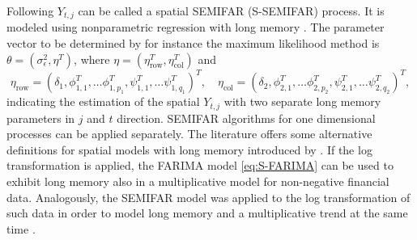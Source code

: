 \documentclass[12pt]{article}
\begin{document}
Following \textcite{beran2009least} \(Y_{t,j}\) can be called a spatial SEMIFAR (S-SEMIFAR) process. It is modeled using nonparametric regression with long memory \parencite{hall1990nonparametric}.
The parameter vector to be determined by for instance the maximum likelihood method is \( \theta = (\sigma_{\epsilon}^{2},\eta^{T}) \), where \( \eta = (\eta_{\text{row}}^{T},\eta_{\text{col}}^{T}) \) and
\begin{equation}
\eta_{\text{row}} = (\delta_1,\phi_{1,1}^{T},\ldots\phi_{1,p_{1}}^{T},\psi_{1,1}^{T},\ldots\psi_{1,q_{1}}^{T})^{T}, \quad 
\eta_{\text{col}} = (\delta_2,\phi_{2,1}^{T},\ldots\phi_{2,p_{2}}^{T},\psi_{2,1}^{T},\ldots\psi_{2,q_{2}}^{T})^{T},
\end{equation}
indicating the estimation of the spatial \(Y_{t,j}\) with two separate long memory parameters in \(j\) and \(t\) direction. 
SEMIFAR algorithms for one dimensional processes can be applied separately.
The literature offers some alternative definitions for spatial models with long memory introduced by \textcite{lavancier2007invariance,lavancier2008v,guo2009local}.
If the log transformation is applied, the FARIMA model \eqref{eq:S-FARIMA} can be used to exhibit long memory also in a multiplicative model for non-negative financial data.
Analogously, the SEMIFAR model was applied to the log transformation of such data in order to model long memory and a multiplicative trend at the same time \parencite{chen2012predicting}.
%
%
%
\end{document}
